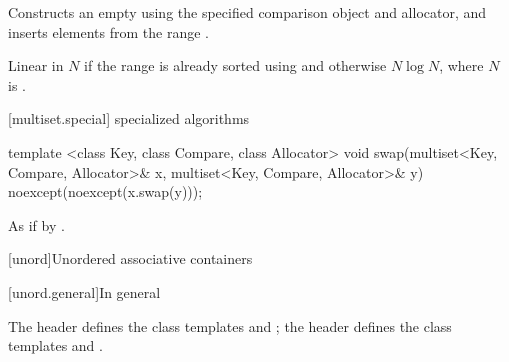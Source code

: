 \begin{itemdescr}
\pnum
\effects
Constructs an empty
using the specified comparison object and allocator,
and inserts elements from the range
.

\pnum
\complexity
Linear in $N$
if the range
is already sorted using  and otherwise $N \log{N}$,
where $N$ is
.
\end{itemdescr}

[multiset.special]{ specialized algorithms}

%
\begin{itemdecl}
template <class Key, class Compare, class Allocator>
  void swap(multiset<Key, Compare, Allocator>& x,
            multiset<Key, Compare, Allocator>& y)
    noexcept(noexcept(x.swap(y)));
\end{itemdecl}

\begin{itemdescr}
\pnum
\effects
As if by .
\end{itemdescr}

[unord]{Unordered associative containers}

[unord.general]{In general}

\pnum
The header  defines the class templates
 and
; the header  defines the class templates
 and .


